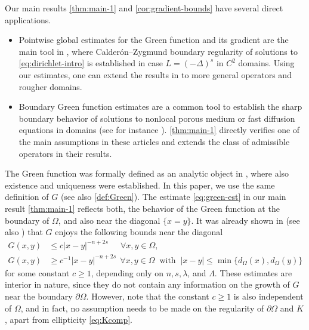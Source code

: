 \documentclass[11pt,reqno]{amsart}
\theoremstyle{plain}
\theoremstyle{definition}
\numberwithin{equation}{section}
\newcommand{\1}{\mathbbm{1}}
\begin{document}
\begin{remark}
    Our main results \autoref{thm:main-1} and \autoref{cor:gradient-bounds} have several direct applications. 
    \hspace{-0.8cm}
   \begin{itemize}
       \item Pointwise global estimates for the Green function and its gradient are the main tool in \cite{AFLY24}, where Calder\'on--Zygmund boundary regularity of solutions to \eqref{eq:dirichlet-intro} is established in case $L = (-\Delta)^s$ in $C^2$ domains. Using our estimates, one can extend the results in \cite{AFLY24} to more general operators and rougher domains.
       \item Boundary Green function estimates are a common tool to establish the sharp boundary behavior of solutions to nonlocal porous medium or fast diffusion equations in domains (see for instance \cite{BoVa15,BFV18,BII23}). \autoref{thm:main-1} directly verifies one of the main assumptions in these articles and extends the class of admissible operators in their results.
   \end{itemize} 
\end{remark}

The Green function was formally defined as an analytic object in \cite{KLL23}, where also existence and uniqueness were established. In this paper, we use the same definition of $G$ (see also \autoref{def:Green}). 
The estimate \eqref{eq:green-est} in our main result \autoref{thm:main-1} reflects both, the behavior of the Green function at the boundary of $\Omega$, and also near the diagonal $\{ x= y \}$.  It was already shown in \cite{KKL23} (see also \cite{CaSi18}) that $G$ enjoys the following bounds near the diagonal
\begin{align}
\label{eq:int-upper}
    G(x,y) &\le c |x-y|^{-n+2s} ~~\quad \forall x,y \in \Omega,\\
    \label{eq:int-lower}
    G(x,y) &\ge c^{-1} |x-y|^{-n+2s} ~~ \forall x,y \in \Omega ~\text{ with } ~ |x-y| \le \min\{ d_{\Omega}(x) , d_{\Omega}(y) \}
\end{align}
for some constant $c \geq 1$, depending only on $n,s,\lambda$, and $\Lambda$.
These estimates are interior in nature, since they do not contain any information on the growth of $G$ near the boundary $\partial \Omega$. However, note that the constant $c \geq 1$ is also independent of $\Omega$, and in fact, no assumption needs to be made on the regularity of $\partial\Omega$ and $K$, apart from ellipticity \eqref{eq:Kcomp}.
\end{document}
